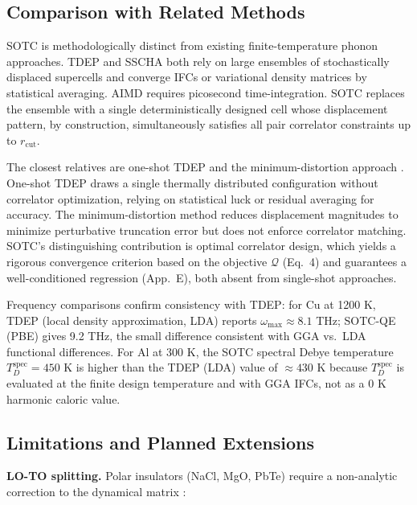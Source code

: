 \documentclass[aps,prb,reprint,amsmath,amssymb,floatfix]{revtex4-2}
\begin{document}
\subsection{Comparison with Related
Methods}\label{comparison-with-related-methods}

SOTC is methodologically distinct from existing finite-temperature
phonon approaches. TDEP \cite{ref5,ref6} and SSCHA \cite{ref7,ref8} both
rely on large ensembles of stochastically displaced supercells and
converge IFCs or variational density matrices by statistical averaging.
AIMD requires picosecond time-integration. SOTC replaces the ensemble
with a single deterministically designed cell whose displacement
pattern, by construction, simultaneously satisfies all pair correlator
constraints up to \(r_\text{cut}\).

The closest relatives are one-shot TDEP \cite{ref10} and the
minimum-distortion approach \cite{ref42}. One-shot TDEP draws a single
thermally distributed configuration without correlator optimization,
relying on statistical luck or residual averaging for accuracy. The
minimum-distortion method \cite{ref42} reduces displacement magnitudes
to minimize perturbative truncation error but does not enforce
correlator matching. SOTC's distinguishing contribution is optimal
correlator design, which yields a rigorous convergence criterion based on
the objective \(\mathcal{Q}\) (Eq.~4) and guarantees a well-conditioned
regression (App.~E), both absent from single-shot approaches.

Frequency comparisons confirm consistency with TDEP: for Cu at 1200 K,
TDEP (local density approximation, LDA) \cite{ref5} reports
\(\omega_\text{max} \approx 8.1\) THz; SOTC-QE (PBE) gives 9.2 THz, the
small difference consistent with GGA vs.~LDA functional differences. For Al at
300 K, the SOTC spectral Debye temperature \(T_D^\text{spec} = 450\) K
is higher than the TDEP (LDA) value of \(\approx 430\) K because
\(T_D^\text{spec}\) is evaluated at the finite design temperature and
with GGA IFCs, not as a 0 K harmonic caloric value.

\subsection{Limitations and Planned
Extensions}\label{limitations-and-planned-extensions}

\textbf{LO-TO splitting.} Polar insulators (NaCl, MgO, PbTe) require a
non-analytic correction to the dynamical matrix \cite{ref39}:
\end{document}
